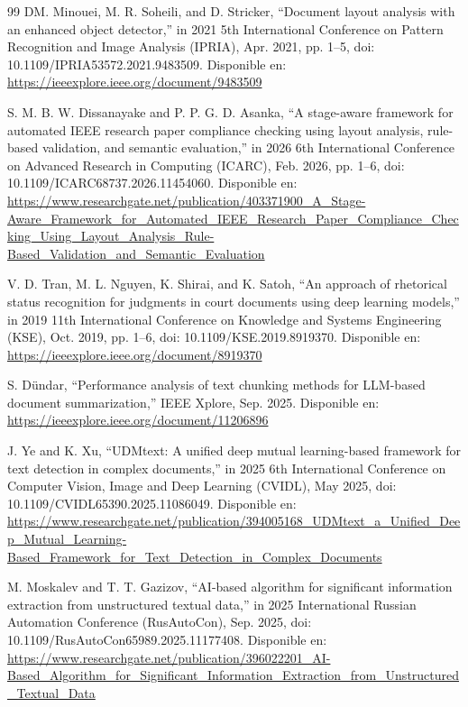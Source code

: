 \begin{thebibliography}{99}
   DM. Minouei, M. R. Soheili, and D. Stricker, “Document layout analysis with an enhanced object detector,” in 2021 5th International Conference on Pattern Recognition and Image Analysis (IPRIA), Apr. 2021, pp. 1--5, doi: 10.1109/IPRIA53572.2021.9483509. Disponible en: \url{https://ieeexplore.ieee.org/document/9483509}

   S. M. B. W. Dissanayake and P. P. G. D. Asanka, “A stage-aware framework for automated IEEE research paper compliance checking using layout analysis, rule-based validation, and semantic evaluation,” in 2026 6th International Conference on Advanced Research in Computing (ICARC), Feb. 2026, pp. 1--6, doi: 10.1109/ICARC68737.2026.11454060. Disponible en: \url{https://www.researchgate.net/publication/403371900_A_Stage-Aware_Framework_for_Automated_IEEE_Research_Paper_Compliance_Checking_Using_Layout_Analysis_Rule-Based_Validation_and_Semantic_Evaluation}

   V. D. Tran, M. L. Nguyen, K. Shirai, and K. Satoh, “An approach of rhetorical status recognition for judgments in court documents using deep learning models,” in 2019 11th International Conference on Knowledge and Systems Engineering (KSE), Oct. 2019, pp. 1--6, doi: 10.1109/KSE.2019.8919370. Disponible en: \url{https://ieeexplore.ieee.org/document/8919370}

   S. Dündar, “Performance analysis of text chunking methods for LLM-based document summarization,” IEEE Xplore, Sep. 2025. Disponible en: \url{https://ieeexplore.ieee.org/document/11206896}

   J. Ye and K. Xu, “UDMtext: A unified deep mutual learning-based framework for text detection in complex documents,” in 2025 6th International Conference on Computer Vision, Image and Deep Learning (CVIDL), May 2025, doi: 10.1109/CVIDL65390.2025.11086049. Disponible en: \url{https://www.researchgate.net/publication/394005168_UDMtext_a_Unified_Deep_Mutual_Learning-Based_Framework_for_Text_Detection_in_Complex_Documents}

   M. Moskalev and T. T. Gazizov, “AI-based algorithm for significant information extraction from unstructured textual data,” in 2025 International Russian Automation Conference (RusAutoCon), Sep. 2025, doi: 10.1109/RusAutoCon65989.2025.11177408. Disponible en: \url{https://www.researchgate.net/publication/396022201_AI-Based_Algorithm_for_Significant_Information_Extraction_from_Unstructured_Textual_Data}


\end{thebibliography}
